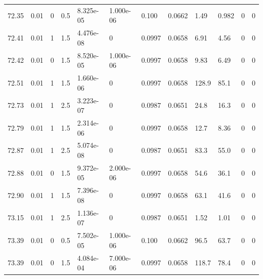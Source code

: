 \documentclass[preview]{standalone}
\begin{document}
{{{{{{{{{{{{{{{{\begin{tabular}{L{1.2cm}C{1.2cm} C{0.3cm}C{0.5cm} C{1.4cm}C{1.4cm} C{1.4cm}C{1.4cm} C{1.6cm}C{1.6cm} C{1.6cm}C{1.6cm}}
  72.35  &  0.01  & 0     & 0.5 &  8.325e-05  & 1.000e-06  &  0.100&   0.0662& 1.49 & 0.982   &  0 & 0  \\ 
  72.41  &  0.01  & 1     & 1.5 &  4.476e-08  & 0  &  0.0997&   0.0658& 6.91 & 4.56   &  0 & 0  \\ 
  72.42  &  0.01  & 0     & 1.5 &  8.520e-05  & 1.000e-06  &  0.0997&   0.0658& 9.83 & 6.49   &  0 & 0  \\ 
  72.51  &  0.01  & 1     & 1.5 &  1.660e-06  & 0  &  0.0997&   0.0658& 128.9 & 85.1   &  0 & 0  \\ 
  72.73  &  0.01  & 1     & 2.5 &  3.223e-07  & 0  &  0.0987&   0.0651& 24.8 & 16.3   &  0 & 0  \\ 
  72.79  &  0.01  & 1     & 1.5 &  2.314e-06  & 0  &  0.0997&   0.0658& 12.7 & 8.36   &  0 & 0  \\ 
  72.87  &  0.01  & 1     & 2.5 &  5.074e-08  & 0  &  0.0987&   0.0651& 83.3 & 55.0   &  0 & 0  \\ 
  72.88  &  0.01  & 0     & 1.5 &  9.372e-05  & 2.000e-06  &  0.0997&   0.0658& 54.6 & 36.1   &  0 & 0  \\ 
  72.90  &  0.01  & 1     & 1.5 &  7.396e-08  & 0  &  0.0997&   0.0658& 63.1 & 41.6   &  0 & 0  \\ 
  73.15  &  0.01  & 1     & 2.5 &  1.136e-07  & 0  &  0.0987&   0.0651& 1.52 & 1.01   &  0 & 0  \\ 
  73.39  &  0.01  & 0     & 0.5 &  7.502e-05  & 1.000e-06  &  0.100&   0.0662& 96.5 & 63.7   &  0 & 0  \\ 
  73.39  &  0.01  & 0     & 1.5 &  4.084e-04  & 7.000e-06  &  0.0997&   0.0658& 118.7 & 78.4   &  0 & 0  \\ 
\hline 
\end{tabular} 

}}}}}}}}}}}}}}}}
\end{document}

